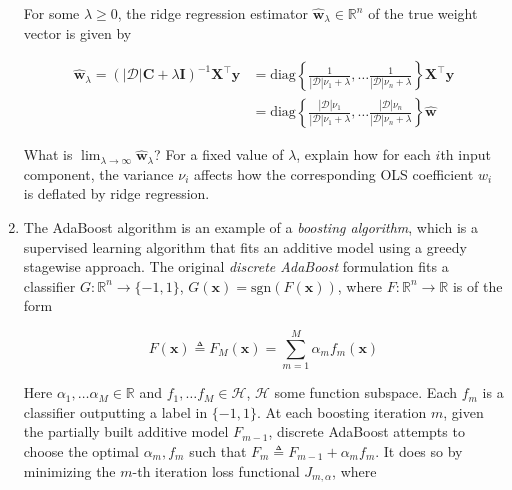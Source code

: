 \documentclass{article}
\numberwithin{equation}{section}
\begin{document}
\begin{enumerate}
    For some $ \lambda \ge 0 $, the ridge regression estimator
    $ \hat{\mathbf{w}}_\lambda \in \mathbb{R}^n $ of the true weight vector is
    given by

    \begin{equation*}
        \begin{split}
            \hat{\mathbf{w}}_\lambda =
            (|\mathcal{D}|\mathbf{C} + \lambda\mathbf{I})^{-1}
            \mathbf{X}^\top\mathbf{y} & =
            \mathrm{diag}\left\{
                \frac{1}{|\mathcal{D}|\nu_1 + \lambda}, \ldots
                \frac{1}{|\mathcal{D}|\nu_n + \lambda}
            \right\}\mathbf{X}^\top\mathbf{y} \\
            & = \mathrm{diag}\left\{
                \frac{|\mathcal{D}|\nu_1}{|\mathcal{D}|\nu_1 + \lambda},
                \ldots \frac{|\mathcal{D}|\nu_n}{|\mathcal{D}|\nu_n + \lambda}
            \right\}\hat{\mathbf{w}}
        \end{split}
    \end{equation*}

    What is $ \lim_{\lambda \rightarrow \infty}\hat{\mathbf{w}}_\lambda $? For
    a fixed value of $ \lambda $, explain how for each $ i $th input component,
    the variance $ \nu_i $ affects how the corresponding OLS coefficient $ w_i $
    is deflated by ridge regression.

    \item
    The AdaBoost\footnotemark{} algorithm is an example of a \textit{boosting algorithm}, which is a
    supervised learning algorithm that fits an additive model using a greedy
    stagewise approach. The original \textit{discrete AdaBoost} formulation fits
    a classifier $ G : \mathbb{R}^n \rightarrow \{-1, 1\} $,
    $ G(\mathbf{x}) = \mathrm{sgn}(F(\mathbf{x})) $, where
    $ F : \mathbb{R}^n \rightarrow \mathbb{R} $ is of the form

    \begin{equation*}
        F(\mathbf{x}) \triangleq F_M(\mathbf{x}) =
        \sum_{m = 1}^M\alpha_mf_m(\mathbf{x})
    \end{equation*}

    Here $ \alpha_1, \ldots \alpha_M \in \mathbb{R} $ and
    $ f_1, \ldots f_M \in \mathcal{H} $, $ \mathcal{H} $ some function subspace.
    Each $ f_m $ is a classifier outputting a label in $ \{-1, 1\} $. At each
    boosting iteration $ m $, given the partially built additive model
    $ F_{m - 1} $, discrete AdaBoost attempts to choose the optimal
    $ \alpha_m, f_m $ such that $ F_m \triangleq F_{m - 1} + \alpha_mf_m $. It
    does so by minimizing the $ m $-th iteration loss functional
    $ J_{m, \alpha} $, where


\end{enumerate}
\end{document}
